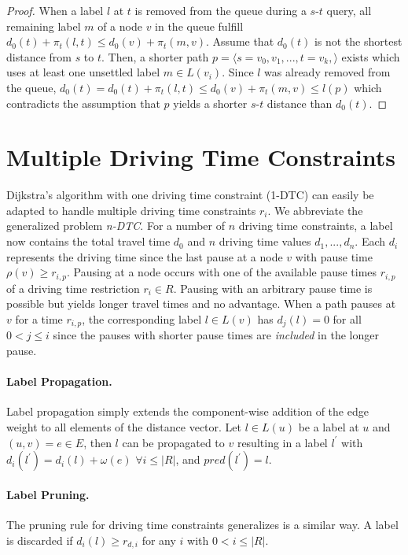 \begin{proof}
	When a label $l$ at $t$ is removed from the queue during a $s$-$t$ query, all remaining label $m$ of a node $v$ in the queue fulfill $d_0(t) + \pi_t(l,t) \le d_0(v) + \pi_t(m,v)$. Assume that $d_0(t)$ is not the shortest distance from $s$ to $t$. Then, a shorter path $p = \langle s=v_0,v_1,...,t=v_k, \rangle$ exists which uses at least one unsettled label $m \in L(v_i)$. Since $l$ was already removed from the queue, $d_0(t) = d_0(t) + \pi_t(l,t) \le  d_0(v) + \pi_t(m,v) \le l(p)$ which contradicts the assumption that $p$ yields a shorter $s$-$t$ distance than $d_0(t)$.
\end{proof}

\section{Multiple Driving Time Constraints}
Dijkstra's algorithm with one driving time constraint (1-DTC) can easily be adapted to handle multiple driving time constraints $r_i$. We abbreviate the generalized problem \emph{n-DTC}. For a number of $n$ driving time constraints, a label now contains the total travel time $d_0$ and $n$ driving time values $d_1, ... , d_n$. Each $d_i$ represents the driving time since the last pause at a node $v$ with pause time $\rho(v) \ge r_{i,p}$. Pausing at a node occurs with one of the available pause times $r_{i,p}$ of a driving time restriction $r_i \in R$. Pausing with an arbitrary pause time is possible but yields longer travel times and no advantage. When a path pauses at $v$ for a time $r_{i,p}$, the corresponding label $l \in L(v)$ has $d_j(l) = 0$ for all $0 < j \le i$ since the pauses with shorter pause times are \emph{included} in the longer pause.

\paragraph{Label Propagation.}
Label propagation simply extends the component-wise addition of the edge weight to all elements of the distance vector. Let $l \in L(u)$ be a label at $u$ and $(u,v) = e \in E$, then $l$ can be propagated to $v$ resulting in a label $l^{'}$ with $d_i(l^{'}) = d_i(l) + \omega(e)$ $\forall i \le |R|$, and $pred(l^{'}) = l$.

\paragraph{Label Pruning.}
The pruning rule for driving time constraints generalizes is a similar way. A label is discarded if $d_i(l) \ge r_{d,i}$ for any $i$ with $0 < i \le |R|$.


